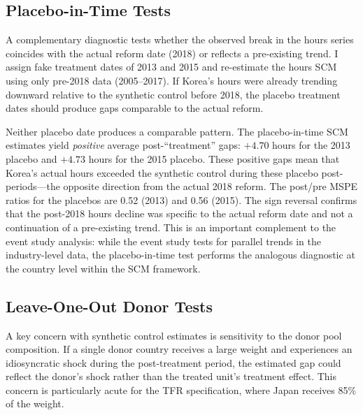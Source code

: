 \documentclass[12pt]{article}
\begin{document}
\subsection{Placebo-in-Time Tests}

A complementary diagnostic tests whether the observed break in the hours series coincides with the actual reform date (2018) or reflects a pre-existing trend. I assign fake treatment dates of 2013 and 2015 and re-estimate the hours SCM using only pre-2018 data (2005--2017). If Korea's hours were already trending downward relative to the synthetic control before 2018, the placebo treatment dates should produce gaps comparable to the actual reform.

Neither placebo date produces a comparable pattern. The placebo-in-time SCM estimates yield \textit{positive} average post-``treatment'' gaps: $+4.70$ hours for the 2013 placebo and $+4.73$ hours for the 2015 placebo. These positive gaps mean that Korea's actual hours exceeded the synthetic control during these placebo post-periods---the opposite direction from the actual 2018 reform. The post/pre MSPE ratios for the placebos are 0.52 (2013) and 0.56 (2015). The sign reversal confirms that the post-2018 hours decline was specific to the actual reform date and not a continuation of a pre-existing trend. This is an important complement to the event study analysis: while the event study tests for parallel trends in the industry-level data, the placebo-in-time test performs the analogous diagnostic at the country level within the SCM framework.

\subsection{Leave-One-Out Donor Tests}

A key concern with synthetic control estimates is sensitivity to the donor pool composition. If a single donor country receives a large weight and experiences an idiosyncratic shock during the post-treatment period, the estimated gap could reflect the donor's shock rather than the treated unit's treatment effect. This concern is particularly acute for the TFR specification, where Japan receives 85\% of the weight.
\end{document}
